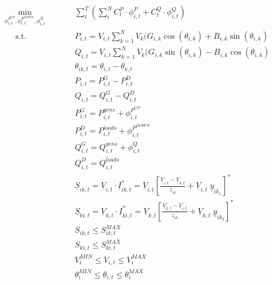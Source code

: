 \begin{subequations}
\begin{alignat}{2}
&\!\min_{\phi_{i,t}^{P^{UP}},\phi_{i,t}^{P^{DOWN}},\phi_{i,t}^{Q}}  &\qquad& \sum_{t}^{T} \left( \sum_{i}^{N} C_t^{P} \cdot \phi_{i,t}^{P} + C_t^{Q} \cdot \phi_{i,t}^{Q} \right) \label{eq:optProb}\\ 
&\phantom{Mi} \text{s.t.} &      & P_{i,t} = V_{i,t} \sum_{k=1}^{N} V_{k} (G_{i,k} \cos(\theta_{i,k}) + B_{i,k} \sin(\theta_{i,k}) \label{eq:activepowernodalbalance} \\ 
&				   &      & Q_{i,t} = V_{i,t} \sum_{k=1}^{N} V_{k} (G_{i,k} \sin(\theta_{i,k}) - B_{i,k} \cos(\theta_{i,k}) \label{eq:reactivepowernodalbalance} \\
&                  &      & \theta_{ik,t} = \theta_{i,t} - \theta_{k,t}\label{eq:voltageangle} \\
&                  &      & P_{i,t} = P_{i,t}^{G} - P_{i,t}^{D} \label{eq:Pi} \\
&                  &      & Q_{i,t} = Q_{i,t}^{G} - Q_{i,t}^{D}  \label{eq:Qi} \\
& 				   & & P_{i,t}^{G} = P_{i,t}^{gens} + \phi_{i,t}^{P^{UP}}    \\
&  				   & & P_{i,t}^{D} = P_{i,t}^{loads} + \phi_{i,t}^{P^{DOWN}}  \\
& 				   & & Q_{i,t}^{G} = Q_{i,t}^{gens} + \phi_{i,t}^{Q}    \\
& 				   & & Q_{i,t}^{D} = Q_{i,t}^{loads}    \\
&                  &      & \underline{S}_{ik,t} = \underline{V}_{i,t} \cdot \underline{I}_{ik,t}^{*} = \underline{V}_{i,t} \left[ \frac{\underline{V}_{i,t} - \underline{V}_{k,t}}{\underline{z}_{ik}} + \underline{V}_{i,t} \; \underline{y}_{ik_1} \right]^{*}  \label{eq:apparentflowlineik} \\
&                  &      & \underline{S}_{ki,t} = \underline{V}_{k,t} \cdot \underline{I}_{ki,t}^{*} = \underline{V}_{k,t} \left[ \frac{\underline{V}_{k,t} - \underline{V}_{i,t}}{\underline{z}_{ik}} + \underline{V}_{k,t} \;  \underline{y}_{ik_2} \right]^{*}  \label{eq:apparentflowlineki} \\
&                  &      &  S_{ik,t} \leq S_{ik,t}^{MAX}  \label{eq:Siklimit} \\
&                  &      &  S_{ki,t} \leq S_{ki,t}^{MAX}   \label{eq:Skilimit} \\ 
&                  &      &  V_{i}^{MIN} \leq V_{i,t} \leq V_{i}^{MAX}  \label{eq:voltagelimit} \\
&                  &      & \theta_{i}^{MIN} \leq \theta_{i,t}  \leq \theta_{i}^{MAX}  \label{eq:voltageangle}
\end{alignat}
\end{subequations}


